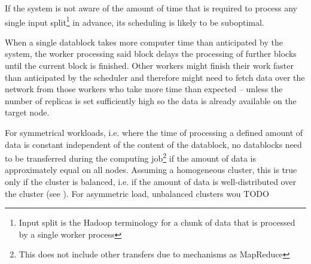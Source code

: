 If the system is not aware of the amount of time that is required to process any single input split\footnote{Input split is the Hadoop terminology for a chunk of data that is processed by a single worker process} in advance, its scheduling is likely to be suboptimal.

When a single datablock takes more computer time than anticipated by the system, the worker processing said block delays the processing of further blocks until the current block is finished. Other workers might finish their work faster than anticipated by the scheduler and therefore might need to fetch data over the network from those workers who take more time than expected -- unless the number of replicas is set sufficiently high so the data is already available on the target node.

For symmetrical workloads, i.e. where the time of processing a defined amount of data is constant independent of the content of the datablock, no datablocks need to be transferred during the computing job\footnote{This does not include other transfers due to mechanisms as MapReduce} if the amount of data is approximately equal on all nodes. Assuming a homogeneous cluster, this is true only if the cluster is balanced, i.e. if the amount of data is well-distributed over the cluster (see \cite[section 7]{white2009hadoop}). For asymmetric load, unbalanced clusters wou TODO
